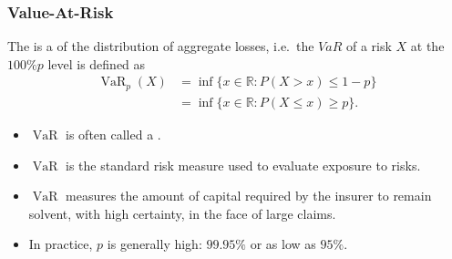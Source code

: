 \documentclass[notoc,notitlepage]{tufte-book}
\DeclareMathOperator{\VaR}{VaR}
\begin{document}
\subsubsection{Value-At-Risk}\label{ssub:Value-At-Risk}

\begin{defn}\label{defn:value_at_risk}
The  is a  of the distribution of aggregate losses, i.e.\ the $VaR$ of a risk $X$ at the $100\%p$ level is defined as
  \begin{align*}
    \VaR_p (X) &= \inf \{ x \in \mathbb{R} : P (X > x) \leq 1 - p \} \\
               &= \inf \{ x \in \mathbb{R} : P (X \leq x) \geq p \}.
  \end{align*}
\end{defn}

\begin{note}
  \begin{itemize}
    \item $\VaR$ is often called a .
    \item $\VaR$ is the standard risk measure used to evaluate exposure to risks.
    \item $\VaR$ measures the amount of capital required by the insurer to remain solvent, with high certainty, in the face of large claims.
    \item In practice, $p$ is generally high: $99.95\%$ or as low as $95\%$.
  \end{itemize}
\end{note}
\end{document}
